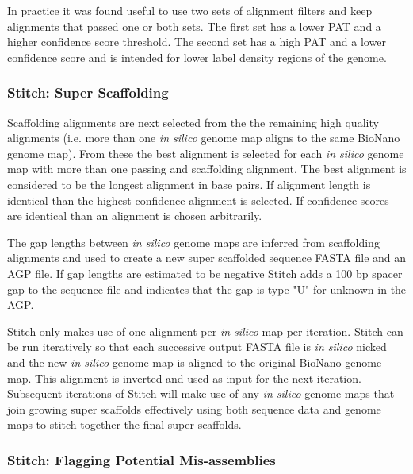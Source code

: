 \documentclass{bmcart}
\begin{document}
In practice it was found useful to use two sets of alignment filters and keep alignments that passed one or both sets. The first set has a lower PAT and a higher confidence score threshold. The second set has a high PAT and a lower confidence score and is intended for lower label density regions of the genome.

\subsubsection*{Stitch: Super Scaffolding}

Scaffolding alignments are next selected from the the remaining high quality alignments (i.e. more than one \textit{in silico} genome map aligns to the same BioNano genome map). From these the best alignment is selected for each \textit{in silico} genome map with more than one passing and scaffolding alignment. The best alignment is considered to be the longest alignment in base pairs. If alignment length is identical than the highest confidence alignment is selected. If confidence scores are identical than an alignment is chosen arbitrarily.

The gap lengths between \textit{in silico} genome maps are inferred from scaffolding alignments and used to create a new super scaffolded sequence FASTA file and an AGP file. If gap lengths are estimated to be negative Stitch adds a 100 bp spacer gap to the sequence file and indicates that the gap is type "U" for unknown in the AGP. 

Stitch only makes use of one alignment per \textit{in silico} map per iteration. Stitch can be run iteratively so that each successive output FASTA file is \textit{in silico} nicked and the new \textit{in silico} genome map is aligned to the original BioNano genome map. This alignment is inverted and used as input for the next iteration. Subsequent iterations of Stitch will make use of any \textit{in silico} genome maps that join growing super scaffolds effectively using both sequence data and genome maps to stitch together the final super scaffolds. 

\subsubsection*{Stitch: Flagging Potential Mis-assemblies}
\end{document}
